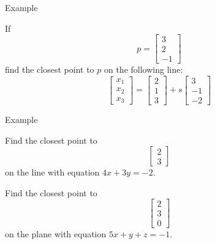 \documentclass{beamer}
\begin{document}
\begin{frame}{Example}
    \begin{example}
    If
    \begin{equation*}
      p= \left[
	\begin{array}{c}
          3\\
          2\\
          -1
	\end{array}
      \right]
    \end{equation*}
    find the closest point to $p$ on the following line:
    \begin{equation*}
      \left[
	\begin{array}{c}
          x_1\\
          x_2\\
          x_3
	\end{array}
      \right] = \left[
	\begin{array}{c}
          2\\
          1\\
          3
	\end{array}
      \right]+s \left[
	\begin{array}{c}
          3\\
          -1\\
          -2
	\end{array}
      \right]
    \end{equation*}
  \end{example}
\end{frame}

\begin{frame}{Example}
    \begin{example}
        Find the closest point to
        \begin{equation*}
          \left[
        \begin{array}{c}
              2\\
              3
        \end{array}
          \right]
        \end{equation*}
        on the line with equation $4x+3y = -2$.
      \end{example}
    \begin{example}
    Find the closest point to
    \begin{equation*}
      \left[
	\begin{array}{c}
          2\\
          3\\
          0
	\end{array}
      \right]
    \end{equation*}
    on the plane with equation $5x+y+z = -1$.
  \end{example}
\end{frame}
\end{document}
